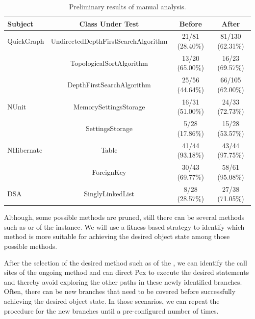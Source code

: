 \begin{table}[t]
\begin{SmallOut}
\begin{CodeOut}
\begin{center}
\centering \caption {\label{tab:results} Preliminary results of manual analysis.}
\begin {tabular} {|l|c|c|c|}
\hline
Subject & Class Under Test & Before & After\\
\hline
\hline QuickGraph & UndirectedDepthFirstSearchAlgorithm & 21/81 (28.40\%) & 81/130 (62.31\%)\\
\hline 						& TopologicalSortAlgorithm 						& 13/20 (65.00\%) & 16/23  (69.57\%)\\
\hline						&	DepthFirstSearchAlgorithm						& 25/56 (44.64\%) & 66/105 (62.00\%)\\
\hline NUnit		  & MemorySettingsStorage								& 16/31 (51.00\%) & 24/33  (72.73\%)\\
\hline						& SettingsStorage											& 5/28  (17.86\%) & 15/28  (53.57\%)\\
\hline NHibernate & Table																& 41/44 (93.18\%) & 43/44  (97.75\%)\\
\hline						& ForeignKey 													& 30/43 (69.77\%) & 58/61  (95.08\%)\\
\hline DSA			  & SinglyLinkedList									  & 8/28  (28.57\%) & 27/38  (71.05\%)\\
\hline
\end{tabular}
\end{center}
\end{CodeOut}
\end{SmallOut}\vspace*{-6ex}
\end{table}

Although, some possible methods are pruned, still there can be several methods such as  or  of the  instance. We will use a fitness based strategy to identify which method is more suitable for achieving the desired object state among those possible methods.

After the selection of the desired method such as  of the , we can identify the call sites of the ongoing method and can direct Pex to execute the desired statements and thereby avoid exploring the other paths in these newly identified branches. Often, there can be new branches that need to be covered before successfully achieving the desired object state. In those scenarios, we can repeat the procedure for the new branches until a pre-configured number of times.

